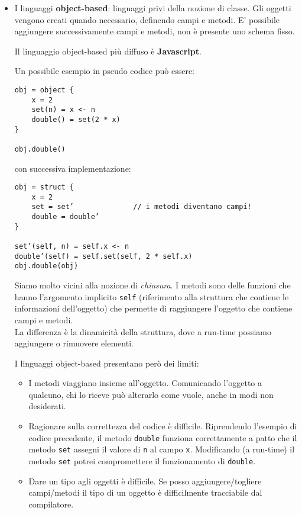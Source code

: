 \documentclass{article}
\begin{document}
\begin{itemize}
    \item I linguaggi \textbf{object-based}: linguaggi privi della nozione di classe. Gli oggetti vengono creati quando necessario, definendo campi e metodi. E' possibile aggiungere successivamente campi e metodi, non è presente uno schema fisso.
    
    Il linguaggio object-based più diffuso è \textbf{Javascript}.

    Un possibile esempio in pseudo codice può essere:
\begin{tcolorbox}
\begin{verbatim}
obj = object {
    x = 2
    set(n) = x <- n
    double() = set(2 * x)
}

obj.double()
\end{verbatim}
\end{tcolorbox}
    con successiva implementazione:
\begin{tcolorbox}
\begin{verbatim}
obj = struct {
    x = 2
    set = set’              // i metodi diventano campi!
    double = double’
}

set’(self, n) = self.x <- n
double’(self) = self.set(self, 2 * self.x)
obj.double(obj)
\end{verbatim}
\end{tcolorbox}
    Siamo molto vicini alla nozione di \textit{chiusura}. I metodi sono delle funzioni che hanno l'argomento implicito \texttt{self} (riferimento alla struttura che contiene le informazioni dell'oggetto) che permette di raggiungere l'oggetto che contiene campi e metodi.\\
    La differenza è la dinamicità della struttura, dove a run-time possiamo aggiungere o rimuovere elementi.

    I linguaggi object-based presentano però dei limiti:
    \begin{itemize}
        \item I metodi viaggiano insieme all'oggetto. Comunicando l'oggetto a qualcuno, chi lo riceve può alterarlo come vuole, anche in modi non desiderati.
        \item Ragionare sulla correttezza del codice è difficile. Riprendendo l'esempio di codice precedente, il metodo \texttt{double} funziona correttamente a patto che il metodo \texttt{set} assegni il valore di \texttt{n} al campo \texttt{x}. Modificando (a run-time) il metodo \texttt{set} potrei compromettere il funzionamento di \texttt{double}.
        \item Dare un tipo agli oggetti è difficile. Se posso aggiungere/togliere campi/metodi il tipo di un oggetto è difficilmente tracciabile dal compilatore.
    \end{itemize}


\end{itemize}
\end{document}
